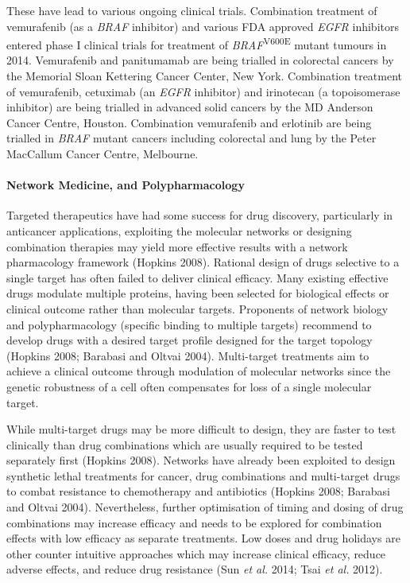 These have lead to various ongoing clinical trials. Combination treatment of vemurafenib (as a \textit{BRAF} inhibitor) and various FDA approved \textit{EGFR} inhibitors entered phase I clinical trials for treatment of \textit{BRAF}\textsuperscript{V600E} mutant tumours in 2014. Vemurafenib and panitumamab are being trialled in colorectal cancers by the Memorial Sloan Kettering Cancer Center, New York. Combination treatment of vemurafenib, cetuximab (an \textit{EGFR} inhibitor) and irinotecan (a topoisomerase inhibitor) are being trialled in advanced solid cancers by the MD Anderson Cancer Centre, Houston. Combination vemurafenib and erlotinib are being trialled in \textit{BRAF} mutant cancers including colorectal and lung by the Peter MacCallum Cancer Centre, Melbourne.  

\paragraph{ Network Medicine, and Polypharmacology}
Targeted therapeutics have had some success for drug discovery, particularly in anticancer applications, exploiting the molecular networks or designing combination therapies may yield more effective results with a network pharmacology framework (Hopkins 2008). Rational design of drugs selective to a single target has often failed to deliver clinical efficacy. Many existing effective drugs modulate multiple proteins, having been selected for biological effects or clinical outcome rather than molecular targets. Proponents of network biology and polypharmacology (specific binding to multiple targets) recommend to develop drugs with a desired target profile designed for the target topology (Hopkins 2008; Barabasi and Oltvai 2004). Multi-target treatments aim to achieve a clinical outcome through modulation of molecular networks since the genetic robustness of a cell often compensates for loss of a single molecular target.  

While multi-target drugs may be more difficult to design, they are faster to test clinically than drug combinations which are usually required to be tested separately first (Hopkins 2008). Networks have already been exploited to design synthetic lethal treatments for cancer, drug combinations and multi-target drugs to combat resistance to chemotherapy and antibiotics (Hopkins 2008; Barabasi and Oltvai 2004). Nevertheless, further optimisation of timing and dosing of drug combinations may increase efficacy and needs to be explored for combination effects with low efficacy as separate treatments. Low doses and drug holidays are other counter intuitive approaches which may increase clinical efficacy, reduce adverse effects, and reduce drug resistance (Sun\textit{ et al.} 2014; Tsai\textit{ et al.} 2012).  

